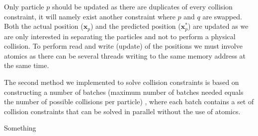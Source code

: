 Only particle $p$ should be updated as there are duplicates of every collision
constraint, it will namely exist another constraint where $p$ and $q$ are
swapped. Both the actual position ($\mathbf{x}_{p}$) and the predicted position
($\mathbf{x}_{p}^{*}$) are updated as we are only interested in separating the
particles and not to perform a physical collision. To perform read and write
(update) of the positions we must involve atomics as there can be several
threads writing to the same memory address at the same time.

The second method we implemented to solve collision constraints is based on
constructing a number of batches (maximum number of batches needed equals the
number of possible collisions per particle) \cite{bullet}, where each batch
contains a set of collision constraints that can be solved in parallel without
the use of atomics.

Something \cite{bullet} \cite{radix}
